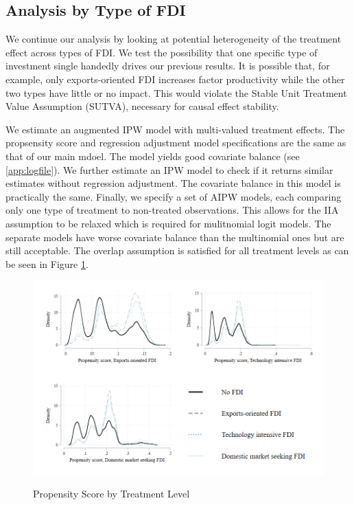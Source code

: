 \documentclass[a4paper,11pt]{scrartcl}
\begin{document}
\subsection{Analysis by Type of FDI}

We continue our analysis by looking at potential heterogeneity of the treatment effect across types of FDI. We test the possibility that one specific type of investment single handedly drives our previous results. It is possible that, for example, only exports-oriented FDI increases factor productivity while the other two types have little or no impact. This would violate the Stable Unit Treatment Value Assumption (SUTVA), necessary for causal effect stability. 

We estimate an augmented IPW model with multi-valued treatment effects. The propsensity score and regression adjustment model specifications are the same as that of our main mdoel. The model yields good covariate balance (see \ref{app:logfile}). We further estimate an IPW model to check if it returns similar estimates without regression adjustment. The covariate balance in this model is practically the same. Finally, we specify a set of AIPW models, each comparing only one type of treatment to non-treated observations. This allows for the IIA assumption to be relaxed which is required for mulitnomial logit models. The separate models have worse covariate balance than the multinomial ones but are still acceptable. The overlap assumption is satisfied for all treatment levels as can be seen in Figure \ref{fig:over_typ}. 

\begin{figure}[h]
	
	\caption{Propensity Score by Treatment Level}
	\includegraphics[width=\linewidth]{overlap_type.png}
	\label{fig:over_typ}
 
\end{figure}
\FloatBarrier
\end{document}
